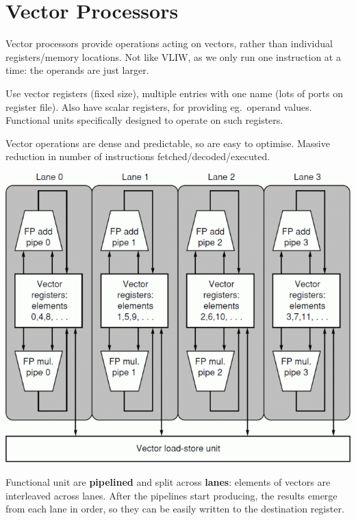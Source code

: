 \documentclass[11pt]{article}
\begin{document}
\section*{Vector Processors}
{
    \begin{minipage}[t]{0.45\textwidth}
    Vector processors provide operations acting on vectors, rather than individual registers/memory locations. Not like VLIW, as we only run one instruction at a time: the operands are just larger.

    Use vector registers (fixed size), multiple entries with one name (lots of ports on register file). Also have scalar registers, for providing eg.\ operand values. Functional units specifically designed to operate on such registers.

    Vector operations are dense and predictable, so are easy to optimise. Massive reduction in number of instructions fetched/decoded/executed.
    \end{minipage}
    \hspace{5mm}
    \begin{minipage}[t]{0.5\textwidth}
    \vspace{0pt}
    \centering
    \includegraphics[width=\textwidth]{vector-lanes.png}
    \end{minipage}

    Functional unit are \textbf{pipelined} and split across \textbf{lanes}: elements of vectors are interleaved across lanes. After the pipelines start producing, the results emerge from each lane in order, so they can be easily written to the destination register.

}
\end{document}
